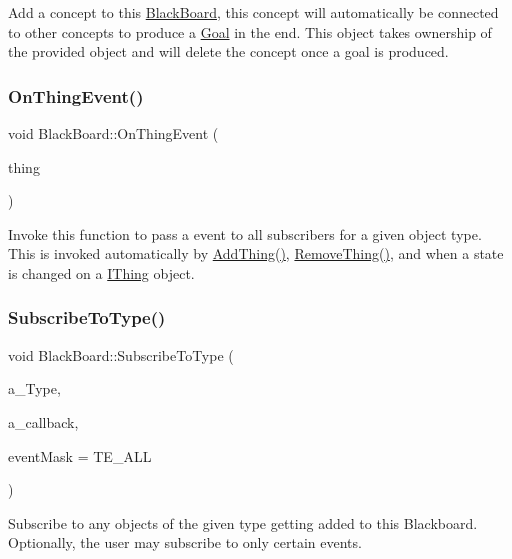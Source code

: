 Add a concept to this \hyperlink{class_black_board}{Black\+Board}, this concept will automatically be connected to other concepts to produce a \hyperlink{class_goal}{Goal} in the end. This object takes ownership of the provided object and will delete the concept once a goal is produced. \mbox{\label{class_black_board_a64acc3b0a151c7124341ec4b67b2a23c}} 
\subsubsection{\texorpdfstring{On\+Thing\+Event()}{OnThingEvent()}}
{\footnotesize\ttfamily void Black\+Board\+::\+On\+Thing\+Event (\begin{DoxyParamCaption}\item[{const \hyperlink{class_thing_event}{Thing\+Event} \&}]{thing }\end{DoxyParamCaption})}

Invoke this function to pass a event to all subscribers for a given object type. This is invoked automatically by \hyperlink{class_black_board_ae5c15e743e9abd413c1711a3091b6da8}{Add\+Thing()}, \hyperlink{class_black_board_a64c506b6e6a6eaaeac52c03ecfe6b4a5}{Remove\+Thing()}, and when a state is changed on a \hyperlink{class_i_thing}{I\+Thing} object. \mbox{\label{class_black_board_a6e3a81af31e182047d78adf2131f8d09}} 
\subsubsection{\texorpdfstring{Subscribe\+To\+Type()}{SubscribeToType()}}
{\footnotesize\ttfamily void Black\+Board\+::\+Subscribe\+To\+Type (\begin{DoxyParamCaption}\item[{const std\+::string \&}]{a\+\_\+\+Type,  }\item[{Delegate$<$ const \hyperlink{class_thing_event}{Thing\+Event} \&$>$}]{a\+\_\+callback,  }\item[{Thing\+Event\+Type}]{event\+Mask = {\ttfamily TE\+\_\+ALL} }\end{DoxyParamCaption})}

Subscribe to any objects of the given type getting added to this Blackboard. Optionally, the user may subscribe to only certain events. \mbox{\label{class_black_board_a743f02f77a5d7008b510459dbcac69d6}} 
